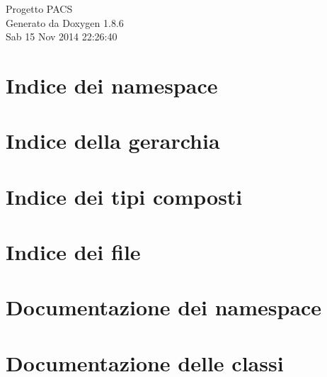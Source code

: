 \documentclass[twoside]{book}
\newcommand{\clearemptydoublepage}{%
  \newpage{\pagestyle{empty}\cleardoublepage}%
}
\begin{document}
\hypersetup{pageanchor=false}
\begin{titlepage}
\vspace*{7cm}
\begin{center}%
{\Large Progetto P\-A\-C\-S }\\
\vspace*{1cm}
{\large Generato da Doxygen 1.8.6}\\
\vspace*{0.5cm}
{\small Sab 15 Nov 2014 22:26:40}\\
\end{center}
\end{titlepage}
\clearemptydoublepage
\tableofcontents
\clearemptydoublepage
{}
\hypersetup{pageanchor=true}

\chapter{Indice dei namespace}

\chapter{Indice della gerarchia}

\chapter{Indice dei tipi composti}

\chapter{Indice dei file}

\chapter{Documentazione dei namespace}


\chapter{Documentazione delle classi}





















\end{document}
